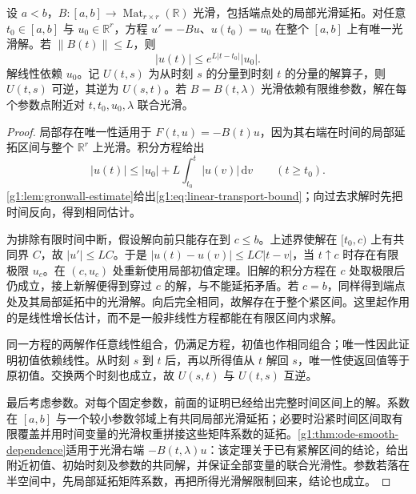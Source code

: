 \begin{lemma}\label{g1:lem:linear-transport-ode}
	设 \(a<b\)，\(B:[a,b]\to\operatorname{Mat}_{r\times r}(\mathbb R)\) 光滑，包括端点处的局部光滑延拓。对任意 \(t_0\in[a,b]\) 与 \(u_0\in\mathbb R^r\)，方程 \(u'=-Bu\)、\(u(t_0)=u_0\) 在整个 \([a,b]\) 上有唯一光滑解。若 \(\|B(t)\|\le L\)，则
	\begin{equation}\label{g1:eq:linear-transport-bound}
		|u(t)|\le e^{L|t-t_0|}|u_0|.
	\end{equation}
	解线性依赖 \(u_0\)。记 \(U(t,s)\) 为从时刻 \(s\) 的分量到时刻 \(t\) 的分量的解算子，则 \(U(t,s)\) 可逆，其逆为 \(U(s,t)\)。若 \(B=B(t,\lambda)\) 光滑依赖有限维参数，解在每个参数点附近对 \(t,t_0,u_0,\lambda\) 联合光滑。
\end{lemma}
\begin{proof}
	局部存在唯一性适用于 \(F(t,u)=-B(t)u\)，因为其右端在时间的局部延拓区间与整个 \(\mathbb R^r\) 上光滑。积分方程给出
	\[
		|u(t)|\le |u_0|+L\int_{t_0}^t|u(v)|\,\mathrm{d}v\qquad(t\ge t_0).
	\]
	\cref{g1:lem:gronwall-estimate}给出\eqref{g1:eq:linear-transport-bound}；向过去求解时先把时间反向，得到相同估计。

	为排除有限时间中断，假设解向前只能存在到 \(c\le b\)。上述界使解在 \([t_0,c)\) 上有共同界 \(C\)，故 \(|u'|\le LC\)。于是 \(|u(t)-u(v)|\le LC|t-v|\)，当 \(t\uparrow c\) 时存在有限极限 \(u_c\)。在 \((c,u_c)\) 处重新使用局部初值定理。旧解的积分方程在 \(c\) 处取极限后仍成立，接上新解便得到穿过 \(c\) 的解，与不能延拓矛盾。若 \(c=b\)，同样得到端点处及其局部延拓中的光滑解。向后完全相同，故解存在于整个紧区间。这里起作用的是线性增长估计，而不是一般非线性方程都能在有限区间内求解。

	同一方程的两解作任意线性组合，仍满足方程，初值也作相同组合；唯一性因此证明初值依赖线性。从时刻 \(s\) 到 \(t\) 后，再以所得值从 \(t\) 解回 \(s\)，唯一性使返回值等于原初值。交换两个时刻也成立，故 \(U(s,t)\) 与 \(U(t,s)\) 互逆。

	最后考虑参数。对每个固定参数，前面的证明已经给出完整时间区间上的解。系数在 \([a,b]\) 与一个较小参数邻域上有共同局部光滑延拓；必要时沿紧时间区间取有限覆盖并用时间变量的光滑权重拼接这些矩阵系数的延拓。\cref{g1:thm:ode-smooth-dependence}适用于光滑右端 \(-B(t,\lambda)u\)：该定理关于已有紧解区间的结论，给出附近初值、初始时刻及参数的共同解，并保证全部变量的联合光滑性。参数若落在半空间中，先局部延拓矩阵系数，再把所得光滑解限制回来，结论也成立。
\end{proof}

